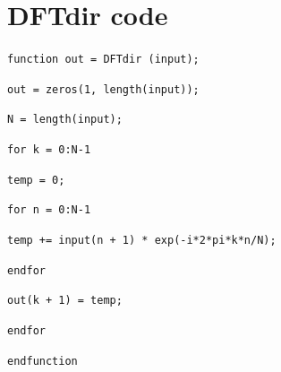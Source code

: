 \documentclass[a4paper, 12pt]{report}
\begin{document}
	\chapter{DFTdir code} %
	\label{sec:dftdir_code}
		\texttt{function out = DFTdir (input);}\par
		\texttt{out = zeros(1, length(input));}\par
		\indent\texttt{N = length(input);}\par
		\texttt{for k = 0:N-1}\par
		\hspace*{2em}\texttt{temp = 0;}\par
		\hspace*{2em}\texttt{for n = 0:N-1}\par
		\hspace*{4em}\texttt{temp += input(n + 1) * exp(-i*2*pi*k*n/N);}\par
		\hspace*{2em}\texttt{endfor}\par
		\hspace*{2em}\texttt{out(k + 1) = temp;}\par
		\texttt{endfor}\par
		\noindent\texttt{endfunction}\par
\end{document}
